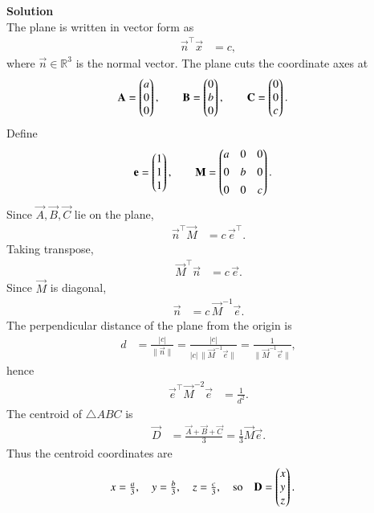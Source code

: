 \documentclass[journal]{IEEEtran}
\begin{document}
\textbf{Solution} \\
The plane is written in vector form as
\begin{align}
\vec{n}^\top \vec{x} &= c,
\end{align}
where $\vec{n}\in\mathbb{R}^3$ is the normal vector.
The plane cuts the coordinate axes at
\begin{align}
\mathbf{A} &= \begin{pmatrix}a\\0\\0\end{pmatrix}, \qquad
\mathbf{B} = \begin{pmatrix}0\\b\\0\end{pmatrix}, \qquad
\mathbf{C} = \begin{pmatrix}0\\0\\c\end{pmatrix}.
\end{align}
Define
\begin{align}
\mathbf{e} &= \begin{pmatrix}1\\1\\1\end{pmatrix}, \qquad 
\mathbf{M} = \begin{pmatrix}a&0&0\\[4pt]0&b&0\\[4pt]0&0&c\end{pmatrix}.
\end{align}
Since $\vec{A},\vec{B},\vec{C}$ lie on the plane,
\begin{align}
\vec{n}^\top \vec{M} &= c\, \vec{e}^\top.
\end{align}
Taking transpose,
\begin{align}
\vec{M}^\top \vec{n} &= c\, \vec{e}.
\end{align}
Since $\vec{M}$ is diagonal,
\begin{align}
\vec{n} &= c\, \vec{M}^{-1} \vec{e}.
\end{align}
The perpendicular distance of the plane from the origin is
\begin{align}
d &= \frac{|c|}{\|\vec{n}\|}
= \frac{|c|}{|c|\,\|\vec{M}^{-1}\vec{e}\|}
= \frac{1}{\|\vec{M}^{-1}\vec{e}\|},
\end{align}
hence
\begin{align}
\vec{e}^\top \vec{M}^{-2} \vec{e} &= \frac{1}{d^2}.
\end{align}
The centroid of $\triangle ABC$ is
\begin{align}
\vec{D} &= \frac{\vec{A}+\vec{B}+\vec{C}}{3}
= \tfrac{1}{3}\vec{M}\vec{e}.
\end{align}
Thus the centroid coordinates are
\begin{align}
x &= \tfrac{a}{3}, \quad y = \tfrac{b}{3}, \quad z = \tfrac{c}{3},
\quad\text{so}\quad
\mathbf{D} = \begin{pmatrix}x\\y\\z\end{pmatrix}.
\end{align}
\end{document}
